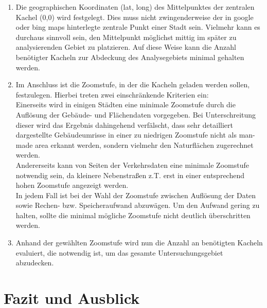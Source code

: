 \documentclass[12pt,a4paper]{scrartcl}
\begin{document}
\begin{enumerate}
\item Die geographischen Koordinaten (lat, long) des Mittelpunktes der zentralen Kachel (0,0) wird festgelegt. Dies muss nicht zwingenderweise der in google oder bing maps hinterlegte zentrale Punkt einer Stadt sein. Vielmehr kann es durchaus sinnvoll sein, den Mittelpunkt möglichst mittig im später zu analysierenden Gebiet zu platzieren. Auf diese Weise kann die Anzahl benötigter Kacheln zur Abdeckung des Analysegebiets minimal gehalten werden.
\newline
\item Im Anschluss ist die Zoomstufe, in der die Kacheln geladen werden sollen, festzulegen. Hierbei treten zwei einschränkende Kriterien ein:\\
Einerseits wird in einigen Städten eine minimale Zoomstufe durch die Auflösung der Gebäude- und Flächendaten vorgegeben. Bei Unterschreitung dieser wird das Ergebnis dahingehend verfälscht, dass sehr detailliert dargestellte Gebäudeumrisse in einer zu niedrigen Zoomstufe nicht als man-made area erkannt werden, sondern vielmehr den Naturflächen zugerechnet werden.\\
Andererseits kann von Seiten der Verkehrsdaten eine minimale Zoomstufe notwendig sein, da kleinere Nebenstraßen z.T. erst in einer entsprechend hohen Zoomstufe angezeigt werden.\\
In jedem Fall ist bei der Wahl der Zoomstufe zwischen Auflösung der Daten sowie Rechen- bzw. Speicheraufwand abzuwägen. Um den Aufwand gering zu halten, sollte die minimal mögliche Zoomstufe nicht deutlich überschritten werden.
\newline
\item Anhand der gewählten Zoomstufe wird nun die Anzahl an benötigten Kacheln evaluiert, die notwendig ist, um das gesamte Untersuchungsgebiet abzudecken. 
\end{enumerate}


\newpage
\section{Fazit und Ausblick}
\end{document}
